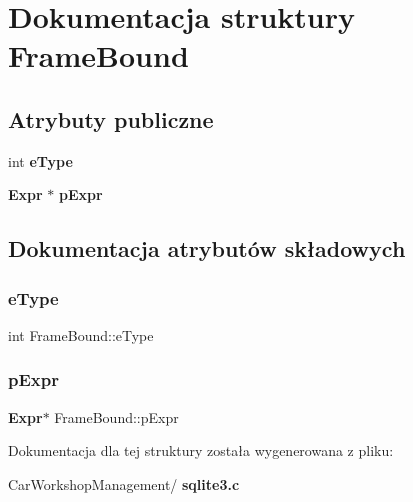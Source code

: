 \section{Dokumentacja struktury Frame\+Bound}
\label{struct_frame_bound}
\subsection*{Atrybuty publiczne}
\begin{DoxyCompactItemize}
\item 
int \textbf{ e\+Type}
\item 
\textbf{ Expr} $\ast$ \textbf{ p\+Expr}
\end{DoxyCompactItemize}


\subsection{Dokumentacja atrybutów składowych}
\mbox{\label{struct_frame_bound_a60b92920c4a3f4cbfea31e690194d569}} 
\subsubsection{eType}
{\footnotesize\ttfamily int Frame\+Bound\+::e\+Type}

\mbox{\label{struct_frame_bound_a46dc3712e712a4808563d19df4bcc8c0}} 
\subsubsection{pExpr}
{\footnotesize\ttfamily \textbf{ Expr}$\ast$ Frame\+Bound\+::p\+Expr}



Dokumentacja dla tej struktury została wygenerowana z pliku\+:\begin{DoxyCompactItemize}
\item 
Car\+Workshop\+Management/\textbf{ sqlite3.\+c}\end{DoxyCompactItemize}

